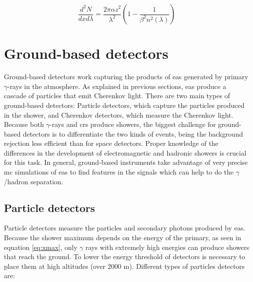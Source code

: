 \documentclass[main.tex]{subfiles}
\begin{document}
\begin{equation}
  \frac{d^2N}{dxd\lambda} = \frac{2\pi \alpha z^2}{\lambda^2}\left( 1-\frac{1}{\beta^2 n^2(\lambda)}\right)
\end{equation}

\section{Ground-based detectors} \label{sec:grounddet}

Ground-based detectors work capturing the products of \gls{eas} generated by primary $\gamma$-rays in the atmosphere. As explained in previous sections, \gls{eas} produce a cascade of particles that emit Cherenkov light. There are two main types of ground-based detectors: Particle detectors, which capture the particles produced in the shower, and Cherenkov detectors, which measure the Cherenkov light. Because both $\gamma$-rays and \glspl{cr} produce showers, the biggest challenge for ground-based detectors is to differentiate the two kinds of events, being the background rejection less efficient than for space detectors. Proper knowledge of the differences in the development of electromagnetic and hadronic showers is crucial for this task. In general, ground-based instruments take advantage of very precise \gls{mc} simulations of \gls{eas} to find features in the signals which can help to do the $\gamma$/hadron separation.

\subsection{Particle detectors}

Particle detectors measure the particles and secondary photons produced by \gls{eas}. Because the shower maximum depends on the energy of the primary, as seen in equation \ref{eq:xmax}, only $\gamma$ rays with extremely high energies can produce showers that reach the ground. To lower the energy threshold of detectors is necessary to place them at high altitudes (over 2000 m). Different types of particles detectors are:\\
\end{document}
